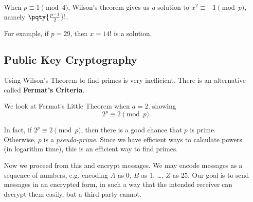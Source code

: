 \begin{remark}
    When \(p \equiv 1 \pmod{4}\), Wilson's theorem gives us \emph{a} solution to \(x^2 \equiv -1 \pmod{p}\), namely \(\pqty{\frac{p - 1}{2}}!\).

    For example, if \(p = 29\), then \(x = 14!\) is a solution.
\end{remark}

\subsection{Public Key Cryptography}
\label{sec:public-key-cryptography}

Using Wilson's Theorem to find primes is very inefficient. There is an alternative called \textbf{Fermat's Criteria}.

We look at Fermat's Little Theorem when \(a = 2\), showing
\[
    2^p \equiv 2 \pmod{p}.
\]

In fact, if \(2^p \equiv 2 \pmod{p}\), then there is a good chance that \(p\) is prime. Otherwise, \(p\) is a \emph{pseudo-prime}. Since we have efficient ways to calculate powers (in logarithm time), this is an efficient way to find primes.

Now we proceed from this and encrypt messages. We may encode messages as a sequence of numbers, e.g. encoding \(A\) as \(0\), \(B\) as \(1\), \dots, \(Z\) as \(25\). Our goal is to send messages in an encrypted form, in such a way that the intended receiver can decrypt them easily, but a third party cannot.

